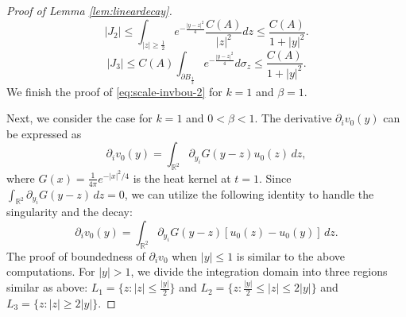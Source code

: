 \documentclass[12pt]{amsart}
\numberwithin{equation}{section}              %
\theoremstyle{remark}
\begin{document}
\begin{proof}[Proof of Lemma \ref{lem:lineardecay}]
\begin{equation*}
			\end{equation*}
			\begin{equation*}
				|J_2|\leq \int_{|z|\geq \frac{1}{2}} e^{-\frac{| y-  z|^2}{4  }} \frac{C(A)}{|z|^2} dz \leq \frac{C(A)}{1+|y|^2}.
			\end{equation*}
			\begin{equation*}
				|J_3|\le C(A)\int_{\partial B_\frac{1}{2}} e^{-\frac{| y-  z|^2}{4  }}  d\sigma_z\leq \frac{C(A)}{1+|y|^2}.
			\end{equation*}
			We finish the proof of \eqref{eq:scale-invbou-2} for $k=1$ and $\beta=1$. 
			
			Next, we consider the case for $k=1$ and  $0 < \beta < 1$. The derivative $\partial_i v_0(y)$ can be expressed as
			\begin{equation*}
				\partial_i v_0(y) = \int_{\mathbb{R}^2} \partial_{y_i} G(y-z) u_0(z) \, dz,
			\end{equation*}
			where $G(x) = \frac{1}{4\pi} e^{-|x|^2/4}$ is the heat kernel at $t=1$. Since $\int_{\mathbb{R}^2} \partial_{y_i} G(y-z) \, dz = 0$, we can utilize the following identity to handle the singularity and the decay:
			\begin{equation} \label{eq:cancel_id}
				\partial_i v_0(y) = \int_{\mathbb{R}^2} \partial_{y_i} G(y-z) [u_0(z) - u_0(y)] \, dz.
			\end{equation}
            The proof of boundedness of $\partial_i v_0$ when $|y|\leq 1$ is similar to the above computations.
For $|y| > 1$, we divide the integration domain into three regions similar as above: $L_1 = \{ z: |z| \leq \frac{|y|}{2} \}$ and $L_2 = \{ z:  \frac{|y|}{2}\leq |z|\leq 2|y| \}$ and $L_3 = \{ z : |z| \geq 2|y| \}$.
			

\end{proof}
\end{document}
